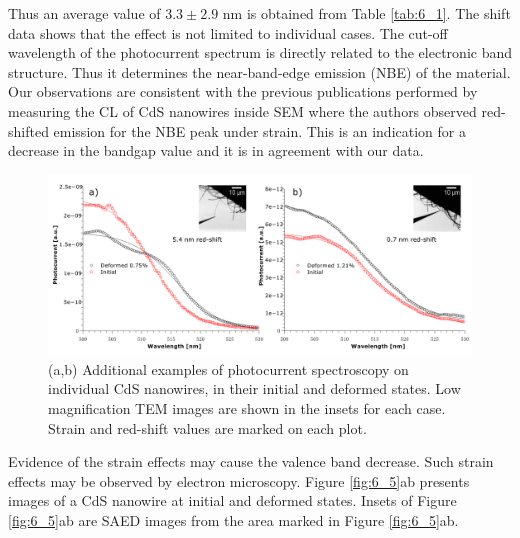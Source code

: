 Thus an average value of $3.3\pm2.9$ nm is obtained from Table \ref{tab:6_1}. The shift data shows that the effect is not limited to individual cases. 
The cut-off wavelength of the photocurrent spectrum is directly related to the electronic band structure. Thus it determines the near-band-edge emission (NBE) of the material. 
Our observations are consistent with the previous publications performed by measuring the CL of CdS nanowires inside SEM where the authors observed red-shifted emission for the NBE peak under strain. 
This is an indication for a decrease in the bandgap value and it is in agreement with our data.\cite{Fu2011}

\begin{figure}  
\includegraphics[width=\textwidth]{figures/figure6_s3}
\caption[Photocurrent spectroscopy of deformed CdS NW]
{(a,b) Additional examples of photocurrent spectroscopy on individual CdS nanowires, in their initial and deformed states. Low magnification TEM images are shown in the insets for each case. Strain and red-shift values are marked on each plot. 
\label{fig:6_s3}}
\end{figure}


Evidence of the strain effects may cause the valence band decrease. Such strain effects may be observed by electron microscopy. 
Figure \ref{fig:6_5}ab presents images of a CdS nanowire at initial and deformed states. 
Insets of Figure \ref{fig:6_5}ab are SAED images from the area marked in Figure \ref{fig:6_5}ab. 

